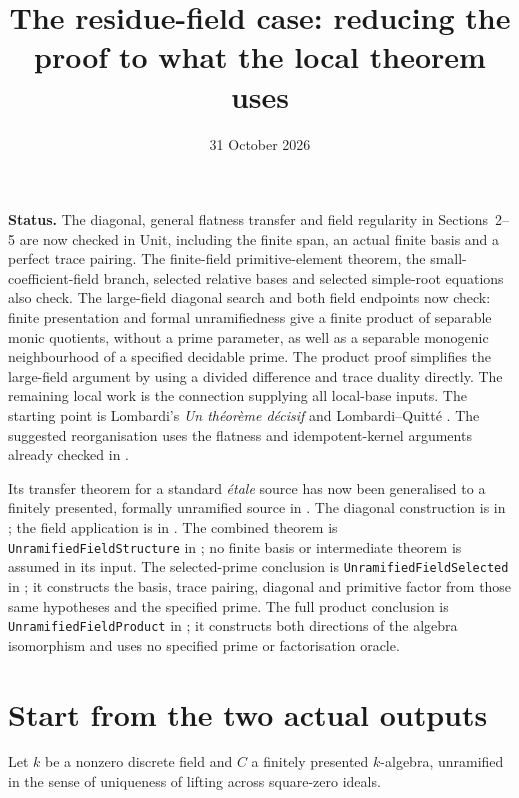 \documentclass[11pt]{article}
\title{The residue-field case: reducing the proof to what the local theorem uses}
\author{}
\date{31 October 2026}
\begin{document}
\maketitle

\noindent\textbf{Status.}
The diagonal, general flatness transfer and field regularity in
Sections~2--5 are now checked in Unit, including the finite span, an
actual finite basis and a perfect trace pairing. The finite-field
primitive-element theorem, the small-coefficient-field branch, selected
relative bases and selected simple-root equations also check. The
large-field diagonal search and both field endpoints now check:
finite presentation and formal unramifiedness give a finite product of
separable monic quotients, without a prime parameter, as well as a
separable monogenic neighbourhood of a specified decidable prime.
The product proof simplifies the large-field argument by using a
divided difference and trace duality directly. The remaining local work
is the connection supplying all local-base inputs.
The starting point is Lombardi's
\emph{Un th\'eor\`eme d\'ecisif} \cite{decisif} and Lombardi--Quitt\'e
\cite{LQ}.  The suggested reorganisation uses the flatness and
idempotent-kernel arguments already checked in
.

Its transfer theorem for a standard
\emph{\'etale} source has now been generalised to a finitely presented,
formally unramified source in .
The diagonal construction is in ;
the field application is in .
The combined theorem is \texttt{UnramifiedFieldStructure} in
; no finite basis or intermediate theorem is
assumed in its input. The selected-prime conclusion is
\texttt{UnramifiedFieldSelected} in ;
it constructs the basis, trace pairing, diagonal and primitive factor
from those same hypotheses and the specified prime.
The full product conclusion is \texttt{UnramifiedFieldProduct} in
; it constructs both directions of the
algebra isomorphism and uses no specified prime or factorisation oracle.

\section{Start from the two actual outputs}

Let $k$ be a nonzero discrete field and $C$ a finitely presented
$k$-algebra, unramified in the sense of uniqueness of lifting across
square-zero ideals.
\end{document}
